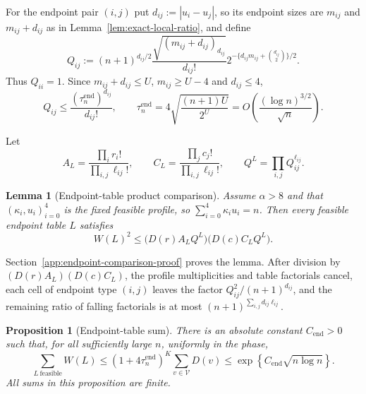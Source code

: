 \documentclass[a4paper,10pt,reqno]{amsart}
\numberwithin{equation}{section}
\theoremstyle{plain}
\newtheorem{proposition}[theorem]{Proposition}
\newtheorem{lemma}[theorem]{Lemma}
\theoremstyle{remark}
\begin{document}
\begin{samepage}
For the endpoint pair $(i,j)$ put $d_{ij}:=|u_i-u_j|$, so its endpoint
sizes are $m_{ij}$ and $m_{ij}+d_{ij}$ as in
Lemma~\ref{lem:exact-local-ratio}, and define
\[
  Q_{ij}:=
  (n+1)^{d_{ij}/2}
  \frac{\sqrt{(m_{ij}+d_{ij})_{d_{ij}}}}{d_{ij}!}
  2^{-\{d_{ij}m_{ij}+\binom{d_{ij}}2\}/2}.
\]
Thus $Q_{ii}=1$. Since $m_{ij}+d_{ij}\le U$, $m_{ij}\ge U-4$ and
$d_{ij}\le4$,
\begin{equation}
  Q_{ij}\le\frac{(\tau_n^{\mathrm{end}})^{d_{ij}}}{d_{ij}!},
  \qquad
  \tau_n^{\mathrm{end}}=
  4\sqrt{\frac{(n+1)U}{2^U}}
  =O\!\left(\frac{(\log n)^{3/2}}{\sqrt n}\right).
  \label{eq:endpoint-eta}
\end{equation}
\end{samepage}

Let
\[
  A_L=\frac{\prod_i r_i!}{\prod_{i,j}\ell_{ij}!},
  \qquad
  C_L=\frac{\prod_j c_j!}{\prod_{i,j}\ell_{ij}!},
  \qquad
  Q^L=\prod_{i,j}Q_{ij}^{\ell_{ij}}.
\]

\begin{lemma}[Endpoint-table product comparison]
\label{lem:endpoint-table-product-comparison}
Assume $\alpha>8$ and that $(\kappa_i,u_i)_{i=0}^4$ is the fixed feasible
profile, so $\sum_{i=0}^4\kappa_i u_i=n$. Then every feasible endpoint table $L$
satisfies
\begin{equation}
  W(L)^2
  \le
  \bigl(D(r)A_LQ^L\bigr)\bigl(D(c)C_LQ^L\bigr).
  \label{eq:endpoint-table-product-comparison}
\end{equation}
\end{lemma}

Section~\ref{app:endpoint-comparison-proof} proves the lemma. After division
by $(D(r)A_L)(D(c)C_L)$, the profile multiplicities and table factorials
cancel, each cell of endpoint type $(i,j)$ leaves the factor
$Q_{ij}^2/(n+1)^{d_{ij}}$, and the remaining ratio of falling factorials is
at most $(n+1)^{\sum_{i,j}d_{ij}\ell_{ij}}$.

\begin{proposition}[Endpoint-table sum]
\label{prop:endpoint-table-sum}
There is an absolute constant $C_{\mathrm{end}}>0$ such that, for all
sufficiently large $n$, uniformly in the phase,
\begin{equation}
  \sum_{L\ \mathrm{feasible}}W(L)
  \le
  (1+4\tau_n^{\mathrm{end}})^K
  \sum_{v\in\mathcal V}D(v)
  \le
  \exp\!\left\{C_{\mathrm{end}}\sqrt{n\log n}\right\}.
  \label{eq:endpoint-table-sum}
\end{equation}
All sums in this proposition are finite.
\end{proposition}
\end{document}
